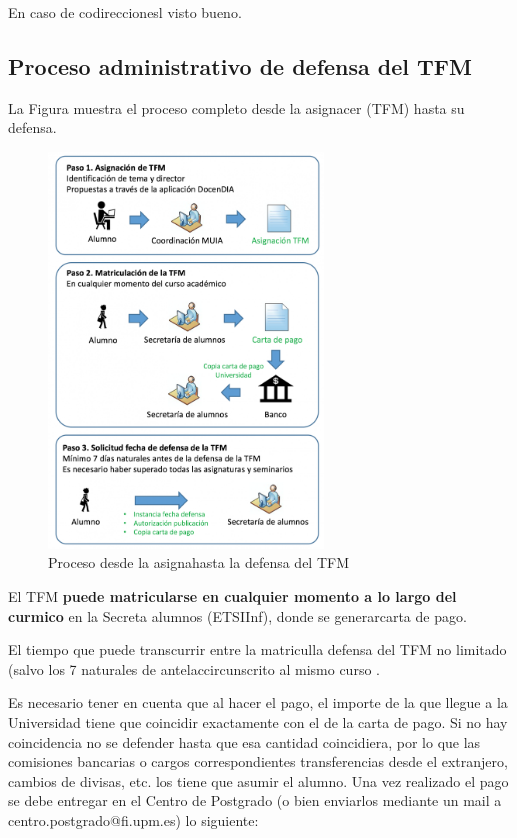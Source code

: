 En caso de codireccionesl visto bueno.


\subsection{Proceso administrativo de defensa del TFM}
\noindent La Figura \label{fig:proceso} muestra el proceso completo desde la asignacer (TFM) hasta su defensa.

\begin{figure}[h]
	\centering
	\includegraphics[width=0.65\textwidth]{recursos/Proceso}
	\caption{Proceso desde la asignahasta la defensa del TFM}
	\label{fig:proceso}
\end{figure}


El TFM {\bf puede matricularse en cualquier momento a lo largo del curmico} en la Secreta alumnos (ETSIInf), donde se generarcarta de pago.

El tiempo que puede transcurrir entre la matriculla defensa del TFM no  limitado (salvo los 7  naturales de antelaccircunscrito al mismo curso .

Es necesario tener en cuenta que al hacer el pago, el importe de la  que llegue a la Universidad tiene que coincidir exactamente con el de la carta de pago. Si no hay coincidencia no se  defender hasta que esa cantidad coincidiera, por lo que las comisiones bancarias o cargos correspondientes transferencias desde el extranjero, cambios de divisas, etc. los tiene que asumir el alumno. Una vez realizado el pago se debe entregar en el Centro de Postgrado (o bien enviarlos mediante un mail a centro.postgrado@fi.upm.es) lo siguiente:


